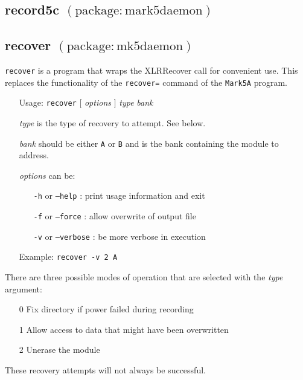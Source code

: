 
\subsection{record5c {\small $\mathrm{(package: mark5daemon)}$}} \label{sec:record5c}





\subsection{recover {\small $\mathrm{(package: mk5daemon)}$}} \label{sec:recover}

{\tt recover} is a program that wraps the XLRRecover call for convenient use.
This replaces the functionality of the {\tt recover=} command of the {\tt Mark5A} program.

\begin{itemize}
\item[] Usage: {\tt recover} $[$ {\em options} $]$ {\em type} {\em bank}

\item[] {\em type} is the type of recovery to attempt.  See below.
\item[] {\em bank} should be either {\tt A} or {\tt B} and is the bank containing the module to address.
\item[] {\em options} can be:
\begin{itemize}
\item[] {\tt -h} or {\tt --help} : print usage information and exit
\item[] {\tt -f} or {\tt --force} : allow overwrite of output file
\item[] {\tt -v} or {\tt --verbose} : be more verbose in execution
\end{itemize}
\item[] Example: {\tt recover -v 2 A}
\end{itemize}

\noindent
There are three possible modes of operation that are selected with the {\em type} argument:
\begin{itemize}
\item[0] Fix directory if power failed during recording
\item[1] Allow access to data that might have been overwritten
\item[2] Unerase the module
\end{itemize}
These recovery attempts will not always be successful.





